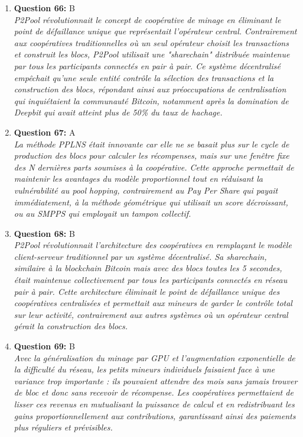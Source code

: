 \documentclass[12pt,a4paper]{article}
\begin{document}
\begin{enumerate}
\item \textbf{Question 66:} B
\\ \textit{P2Pool révolutionnait le concept de coopérative de minage en éliminant le point de défaillance unique que représentait l'opérateur central. Contrairement aux coopératives traditionnelles où un seul opérateur choisit les transactions et construit les blocs, P2Pool utilisait une "sharechain" distribuée maintenue par tous les participants connectés en pair à pair. Ce système décentralisé empêchait qu'une seule entité contrôle la sélection des transactions et la construction des blocs, répondant ainsi aux préoccupations de centralisation qui inquiétaient la communauté Bitcoin, notamment après la domination de Deepbit qui avait atteint plus de 50\% du taux de hachage.}

\item \textbf{Question 67:} A
\\ \textit{La méthode PPLNS était innovante car elle ne se basait plus sur le cycle de production des blocs pour calculer les récompenses, mais sur une fenêtre fixe des N dernières parts soumises à la coopérative. Cette approche permettait de maintenir les avantages du modèle proportionnel tout en réduisant la vulnérabilité au pool hopping, contrairement au Pay Per Share qui payait immédiatement, à la méthode géométrique qui utilisait un score décroissant, ou au SMPPS qui employait un tampon collectif.}

\item \textbf{Question 68:} B
\\ \textit{P2Pool révolutionnait l'architecture des coopératives en remplaçant le modèle client-serveur traditionnel par un système décentralisé. Sa sharechain, similaire à la blockchain Bitcoin mais avec des blocs toutes les 5 secondes, était maintenue collectivement par tous les participants connectés en réseau pair à pair. Cette architecture éliminait le point de défaillance unique des coopératives centralisées et permettait aux mineurs de garder le contrôle total sur leur activité, contrairement aux autres systèmes où un opérateur central gérait la construction des blocs.}

\item \textbf{Question 69:} B
\\ \textit{Avec la généralisation du minage par GPU et l'augmentation exponentielle de la difficulté du réseau, les petits mineurs individuels faisaient face à une variance trop importante : ils pouvaient attendre des mois sans jamais trouver de bloc et donc sans recevoir de récompense. Les coopératives permettaient de lisser ces revenus en mutualisant la puissance de calcul et en redistribuant les gains proportionnellement aux contributions, garantissant ainsi des paiements plus réguliers et prévisibles.}


\end{enumerate}
\end{document}
